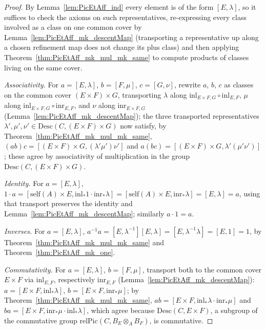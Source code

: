 \begin{proof}
  \leanok
  By Lemma~\ref{lem:PicEtAff_ind} every element is of the form \([E,\lambda]\), so it suffices
  to check the axioms on such representatives, re-expressing every class involved as a class on
  one common cover by Lemma~\ref{lem:PicEtAff_mk_descentMap} (transporting a representative up
  along a chosen refinement map does not change its plus class) and then applying
  Theorem~\ref{thm:PicEtAff_mk_mul_mk_same} to compute products of classes living on the same
  cover.

  \emph{Associativity.} For \(a = [E,\lambda]\), \(b = [F,\mu]\), \(c = [G,\nu]\), rewrite
  \(a\), \(b\), \(c\) as classes on the common cover \((E \times F) \times G\), transporting
  \(\lambda\) along \(\mathrm{inl}_{E \times F, G} \circ \mathrm{inl}_{E,F}\), \(\mu\) along
  \(\mathrm{inl}_{E \times F, G} \circ \mathrm{inr}_{E,F}\), and \(\nu\) along
  \(\mathrm{inr}_{E \times F, G}\) (Lemma~\ref{lem:PicEtAff_mk_descentMap}); the three
  transported representatives \(\lambda', \mu', \nu' \in \mathrm{Desc}(C, (E \times F) \times
  G)\) now satisfy, by Theorem~\ref{thm:PicEtAff_mk_mul_mk_same}, \((ab)c = [(E \times F)
  \times G, (\lambda'\mu')\nu']\) and \(a(bc) = [(E \times F) \times G, \lambda'(\mu'\nu')]\);
  these agree by associativity of multiplication in the group \(\mathrm{Desc}(C,(E \times F)
  \times G)\).

  \emph{Identity.} For \(a = [E,\lambda]\), \(1 \cdot a = [\mathrm{self}(A) \times E,
  \mathrm{inl}_{*}1 \cdot \mathrm{inr}_{*}\lambda] = [\mathrm{self}(A) \times E,
  \mathrm{inr}_{*}\lambda] = [E,\lambda] = a\), using that transport preserves the identity and
  Lemma~\ref{lem:PicEtAff_mk_descentMap}; similarly \(a \cdot 1 = a\).

  \emph{Inverses.} For \(a = [E,\lambda]\), \(a^{-1} a = [E,\lambda^{-1}][E,\lambda] =
  [E,\lambda^{-1}\lambda] = [E,1] = 1\), by Theorem~\ref{thm:PicEtAff_mk_mul_mk_same} and
  Theorem~\ref{thm:PicEtAff_mk_one}.

  \emph{Commutativity.} For \(a = [E,\lambda]\), \(b = [F,\mu]\), transport both to the common
  cover \(E \times F\) via \(\mathrm{inl}_{E,F}\), respectively \(\mathrm{inr}_{E,F}\)
  (Lemma~\ref{lem:PicEtAff_mk_descentMap}): \(a = [E \times F, \mathrm{inl}_{*}\lambda]\), \(b =
  [E \times F, \mathrm{inr}_{*}\mu]\); by Theorem~\ref{thm:PicEtAff_mk_mul_mk_same}, \(ab = [E
  \times F, \mathrm{inl}_{*}\lambda \cdot \mathrm{inr}_{*}\mu]\) and \(ba = [E \times F,
  \mathrm{inr}_{*}\mu \cdot \mathrm{inl}_{*}\lambda]\), which agree because \(\mathrm{Desc}(C,E
  \times F)\), a subgroup of the commutative group \(\mathrm{relPic}(C, B_E \otimes_A B_F)\),
  is commutative.
\end{proof}

